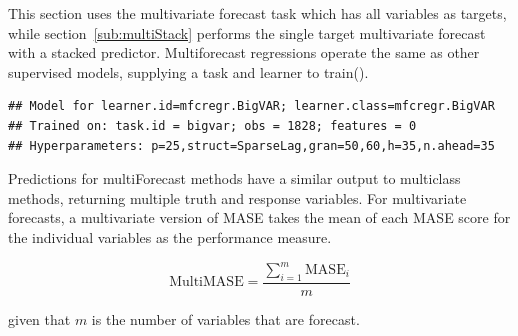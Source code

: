 \documentclass[12pt]{article}%
\makeatletter
\theoremstyle{definition}
\newcommand\code{\@codex}
\def\@codex#1{{\normalfont\ttfamily\hyphenchar\font=-1 #1}}
\makeatother
\begin{document}
This section uses the multivariate forecast task which has all variables as targets, while section~\ref{sub:multiStack} performs the single target multivariate forecast with a stacked predictor. Multiforecast regressions operate the same as other supervised models, supplying a task and learner to \code{train()}.

\singlespacing
\begin{knitrout}
\color{fgcolor}\begin{kframe}
\begin{alltt}
 \hlkwb{=} \hlstd{(} 
                      
\end{alltt}
\end{kframe}
\end{knitrout}

\begin{knitrout}
\color{fgcolor}\begin{kframe}
\begin{verbatim}
## Model for learner.id=mfcregr.BigVAR; learner.class=mfcregr.BigVAR
## Trained on: task.id = bigvar; obs = 1828; features = 0
## Hyperparameters: p=25,struct=SparseLag,gran=50,60,h=35,n.ahead=35
\end{verbatim}
\end{kframe}
\end{knitrout}
\doublespacing

Predictions for \code{multiForecast} methods have a similar output to \code{multiclass} methods, returning multiple truth and response variables. For multivariate forecasts, a multivariate version of MASE takes the mean of each MASE score for the individual variables as the performance measure.

\begin{equation}
\text{MultiMASE} = \frac{\sum_{i=1}^m \text{MASE}_i}{m}
\end{equation}

given that $m$ is the number of variables that are forecast.
\end{document}
